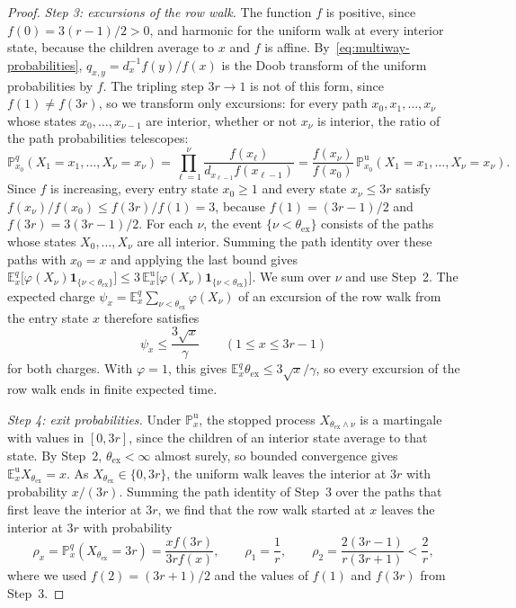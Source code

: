 \begin{proof}
\emph{Step 3: excursions of the row walk.} The function \(f\) is positive,
since \(f(0)=3(r-1)/2>0\), and harmonic for the uniform walk at every
interior state, because the children average to \(x\) and \(f\) is
affine. By~\eqref{eq:multiway-probabilities},
\(q_{x,y}=d_x^{-1}f(y)/f(x)\) is the Doob transform of the uniform
probabilities by \(f\). The tripling step \(3r\to1\) is not of this form,
since \(f(1)\ne f(3r)\), so we transform only excursions: for every path
\(x_0,x_1,\ldots,x_\nu\) whose states \(x_0,\ldots,x_{\nu-1}\) are
interior, whether or not \(x_\nu\) is interior, the ratio of the path
probabilities telescopes:
\[
 \mathbb P^q_{x_0}(X_1=x_1,\ldots,X_\nu=x_\nu)
 =\prod_{\ell=1}^\nu\frac{f(x_\ell)}{d_{x_{\ell-1}}f(x_{\ell-1})}
 =\frac{f(x_\nu)}{f(x_0)}\,
  \mathbb P^{\mathrm u}_{x_0}(X_1=x_1,\ldots,X_\nu=x_\nu).
\]
Since \(f\) is increasing, every entry state \(x_0\ge1\) and every state
\(x_\nu\le3r\) satisfy
\(f(x_\nu)/f(x_0)\le f(3r)/f(1)=3\), because \(f(1)=(3r-1)/2\) and
\(f(3r)=3(3r-1)/2\). For each \(\nu\), the event
\(\{\nu<\theta_{\mathrm{ex}}\}\) consists of the paths whose states \(X_0,\ldots,X_\nu\) are all interior. Summing the
path identity over these paths with \(x_0=x\) and applying the last bound
gives
\(\mathbb E^q_x\bigl[\varphi(X_\nu)\mathbf 1_{\{\nu<\theta_{\mathrm{ex}}\}}\bigr]
\le3\,\mathbb E^{\mathrm u}_x\bigl[\varphi(X_\nu)\mathbf 1_{\{\nu<\theta_{\mathrm{ex}}\}}\bigr]\).
We sum over \(\nu\) and use Step~2. The expected charge
\(\psi_x=\mathbb E^q_x\sum_{\nu<\theta_{\mathrm{ex}}}\varphi(X_\nu)\) of
an excursion of the row walk from the entry state \(x\) therefore
satisfies
\begin{equation}\label{eq:harmonic-excursion-bound}
 \psi_x\le\frac{3\sqrt x}\gamma\qquad(1\le x\le3r-1)
\end{equation}
for both charges. With \(\varphi=1\), this gives
\(\mathbb E^q_x\theta_{\mathrm{ex}}\le3\sqrt x/\gamma\), so every
excursion of the row walk ends in finite expected time.

\emph{Step 4: exit probabilities.} Under \(\mathbb P^{\mathrm u}_x\), the
stopped process \(X_{\theta_{\mathrm{ex}}\wedge\nu}\) is a martingale with
values in \([0,3r]\), since the children of an interior state average to
that state. By Step~2, \(\theta_{\mathrm{ex}}<\infty\) almost surely, so
bounded convergence gives
\(\mathbb E^{\mathrm u}_xX_{\theta_{\mathrm{ex}}}=x\). As
\(X_{\theta_{\mathrm{ex}}}\in\{0,3r\}\), the uniform walk leaves the
interior at \(3r\) with probability \(x/(3r)\). Summing the path identity
of Step~3 over the paths that first leave the interior at \(3r\), we find
that the row walk started at \(x\) leaves the interior at \(3r\) with
probability
\begin{equation}\label{eq:exit-probability}
 \rho_x=\mathbb P^q_x(X_{\theta_{\mathrm{ex}}}=3r)=\frac{xf(3r)}{3rf(x)},\qquad
 \rho_1=\frac1r,\qquad
 \rho_2=\frac{2(3r-1)}{r(3r+1)}<\frac2r,
\end{equation}
where we used \(f(2)=(3r+1)/2\) and the values of \(f(1)\) and \(f(3r)\)
from Step~3.


\end{proof}
